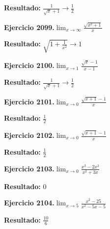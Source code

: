 \documentclass[10pt,a4paper]{article}
\begin{document}
\begin{solbox}
\textbf{Resultado:} \(\displaystyle \frac{1}{\sqrt{x}+1} \to \frac{1}{2}\)
\end{solbox}

\newpage
\begin{ejbox}
\textbf{Ejercicio 2099.}\quad $\lim_{x\to \infty} \frac{\sqrt{x^2+1}}{x}$
\end{ejbox}

\begin{solbox}
\textbf{Resultado:} \(\displaystyle \sqrt{1+\frac{1}{x^2}} \to 1\)
\end{solbox}

\begin{ejbox}
\textbf{Ejercicio 2100.}\quad $\lim_{x\to 1} \frac{\sqrt{x}-1}{x-1}$
\end{ejbox}

\begin{solbox}
\textbf{Resultado:} \(\displaystyle \frac{1}{\sqrt{x}+1} \to \frac{1}{2}\)
\end{solbox}

\begin{ejbox}
\textbf{Ejercicio 2101.}\quad $\lim_{x\to 0} \frac{\sqrt{x+1}-1}{x}$
\end{ejbox}

\begin{solbox}
\textbf{Resultado:} \(\displaystyle \frac{1}{2}\)
\end{solbox}

\newpage
\begin{ejbox}
\textbf{Ejercicio 2102.}\quad $\lim_{x\to 0} \frac{\sqrt{x+1}-1}{x}$
\end{ejbox}

\begin{solbox}
\textbf{Resultado:} \(\displaystyle \frac{1}{2}\)
\end{solbox}

\begin{ejbox}
\textbf{Ejercicio 2103.}\quad $\lim_{x\to 0} \frac{x^3-2x^2}{x^2+3x}$
\end{ejbox}

\begin{solbox}
\textbf{Resultado:} \(\displaystyle 0\)
\end{solbox}

\begin{ejbox}
\textbf{Ejercicio 2104.}\quad $\lim_{x\to 5} \frac{x^2-25}{x^2-5x-5}$
\end{ejbox}

\begin{solbox}
\textbf{Resultado:} \(\displaystyle \frac{10}{6}\)
\end{solbox}
\end{document}
